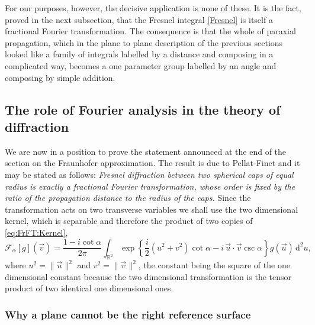 			For our purposes, however, the decisive application is none of these. It is the fact, proved in the next subsection, that the Fresnel integral \eqref{Fresnel} is itself a fractional Fourier transformation. The consequence is that the whole of paraxial propagation, which in the plane to plane description of the previous sections looked like a family of integrals labelled by a distance and composing in a complicated way, becomes a one parameter group labelled by an angle and composing by simple addition.

	\subsection{The role of Fourier analysis in the theory of diffraction}

		We are now in a position to prove the statement announced at the end of the section on the Fraunhofer approximation. The result is due to Pellat-Finet \citep{pellatfinet1994fresnel, pellatfinet1994fractional} and it may be stated as follows: \textit{Fresnel diffraction between two spherical caps of equal radius is exactly a fractional Fourier transformation, whose order is fixed by the ratio of the propagation distance to the radius of the caps.} Since the transformation acts on two transverse variables we shall use the two dimensional kernel, which is separable and therefore the product of two copies of \eqref{eq:FrFT:Kernel},
		\begin{equation}\label{eq:FrFT:Kernel2D}
			\mathcal{F}_{\alpha}[g](\vec{v}) = \frac{1-i\cot\alpha}{2\pi}\int_{\mathbb{R}^{2}}\exp\left\{\frac{i}{2}\left(u^{2}+v^{2}\right)\cot\alpha - i\,\vec{u}\cdot\vec{v}\csc\alpha\right\}g(\vec{u})\,\mathrm{d}^{2}u,
		\end{equation}
		where $u^{2}=\|\vec{u}\|^{2}$ and $v^{2}=\|\vec{v}\|^{2}$, the constant being the square of the one dimensional constant because the two dimensional transformation is the tensor product of two identical one dimensional ones.

		\subsubsection{Why a plane cannot be the right reference surface}

